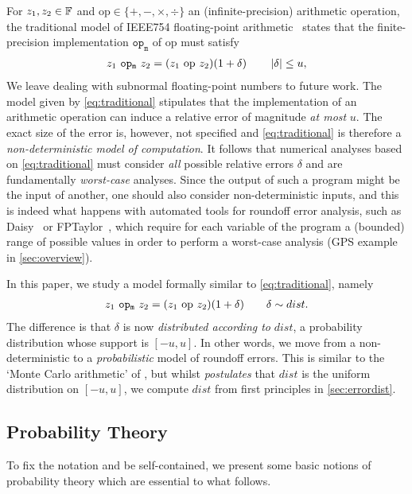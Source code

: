 For $z_1,z_2\in\mathbb{F}$ and $\mathrm{op}\in\{+,-,\times,\div\}$ an (infinite-precision) arithmetic operation, the traditional model of
IEEE754 floating-point arithmetic~\cite{ieee754} \cite{higham2002accuracy} states that the finite-precision implementation $\mathtt{op_m}$ of $\mathrm{op}$ must satisfy
\begin{align}
z_1~\mathtt{op_m}~ z_2=(z_1~\mathrm{op}~ z_2)(1+\delta) \qquad\left\lvert \delta\right\rvert\leq u, \label{eq:traditional}
\end{align}
We leave dealing with subnormal floating-point numbers to future work. The model given by \cref{eq:traditional} stipulates that the implementation of an arithmetic operation can induce a relative error of magnitude \emph{at most} $u$. The exact size of the error is, however, not specified and \cref{eq:traditional} is therefore a \emph{non-deterministic model of computation}. It follows that numerical analyses based on \cref{eq:traditional} must consider \emph{all} possible relative errors $\delta$ and are fundamentally \emph{worst-case} analyses. 
Since the output of such a program might be the input of another,  one should also consider non-deterministic inputs, and this is indeed what happens with automated tools for roundoff error analysis, such as Daisy~\cite{darulova2018daisy} or FPTaylor~\cite{2015_fm_sjrg,solovyev2018rigorous}, which require for each variable of the program a (bounded) range of possible values in order to perform a worst-case analysis (\cf GPS example in \cref{sec:overview}).

In this paper, we study a model formally similar to \cref{eq:traditional}, namely
\begin{align}
z_1~\mathtt{op_m}~ z_2=(z_1~\mathrm{op}~ z_2)(1+\delta) \qquad\delta\sim dist.\label{eq:probabilistic}
\end{align}
The difference is that $\delta$ is now \emph{distributed according to} $dist$, a probability distribution whose support is $\left[-u,u\right]$.  In other words, we move from a non-deterministic to a \emph{probabilistic} model of roundoff errors.  This is similar to the `Monte Carlo arithmetic' of \cite{parker2000monte}, but whilst \opcit \emph{postulates} that $dist$ is the uniform distribution on $[-u,u]$, we compute $dist$ from first principles in \cref{sec:errordist}.

\subsection{Probability Theory}\label{subsec:prob}

To fix the notation and be self-contained, we present some basic notions of probability theory which are essential to what follows.  

